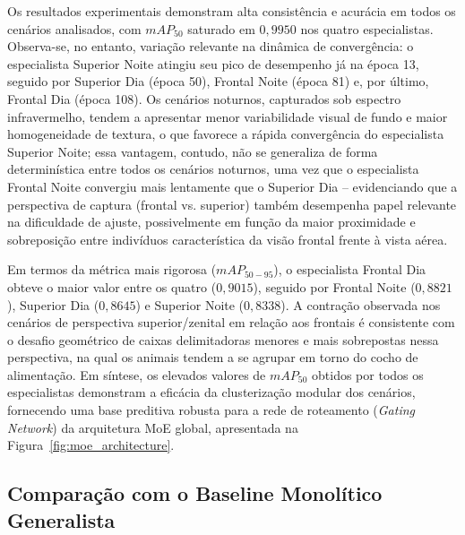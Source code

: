 \documentclass[12pt,fleqn]{article}
\begin{document}
Os resultados experimentais demonstram alta consistência e acurácia em todos os cenários analisados, com $mAP_{50}$ saturado em $0,9950$ nos quatro especialistas. Observa-se, no entanto, variação relevante na dinâmica de convergência: o especialista Superior Noite atingiu seu pico de desempenho já na época 13, seguido por Superior Dia (época 50), Frontal Noite (época 81) e, por último, Frontal Dia (época 108). Os cenários noturnos, capturados sob espectro infravermelho, tendem a apresentar menor variabilidade visual de fundo e maior homogeneidade de textura, o que favorece a rápida convergência do especialista Superior Noite; essa vantagem, contudo, não se generaliza de forma determinística entre todos os cenários noturnos, uma vez que o especialista Frontal Noite convergiu mais lentamente que o Superior Dia -- evidenciando que a perspectiva de captura (frontal vs. superior) também desempenha papel relevante na dificuldade de ajuste, possivelmente em função da maior proximidade e sobreposição entre indivíduos característica da visão frontal frente à vista aérea.

Em termos da métrica mais rigorosa ($mAP_{50-95}$), o especialista Frontal Dia obteve o maior valor entre os quatro ($0,9015$), seguido por Frontal Noite ($0,8821$), Superior Dia ($0,8645$) e Superior Noite ($0,8338$). A contração observada nos cenários de perspectiva superior/zenital em relação aos frontais é consistente com o desafio geométrico de caixas delimitadoras menores e mais sobrepostas nessa perspectiva, na qual os animais tendem a se agrupar em torno do cocho de alimentação. Em síntese, os elevados valores de $mAP_{50}$ obtidos por todos os especialistas demonstram a eficácia da clusterização modular dos cenários, fornecendo uma base preditiva robusta para a rede de roteamento (\textit{Gating Network}) da arquitetura MoE global, apresentada na Figura~\ref{fig:moe_architecture}.

\subsection{Comparação com o Baseline Monolítico Generalista}
\label{subsec:baseline_overall}
\end{document}
